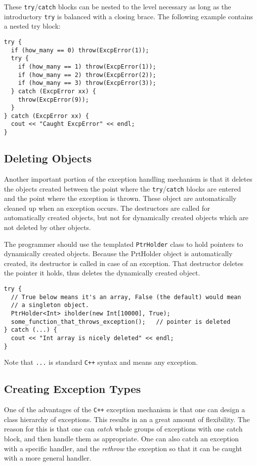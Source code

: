These {\tt try}/{\tt catch} blocks can be nested to the level necessary as
long as the introductory {\tt try} is balanced with a closing brace.
The following example contains a nested try block:
\begin{verbatim}
try {
  if (how_many == 0) throw(ExcpError(1));
  try {
    if (how_many == 1) throw(ExcpError(1));
    if (how_many == 2) throw(ExcpError(2));
    if (how_many == 3) throw(ExcpError(3));
  } catch (ExcpError xx) {
    throw(ExcpError(9));
  }
} catch (ExcpError xx) {
  cout << "Caught ExcpError" << endl;    
}
\end{verbatim}


\subsection{Deleting Objects}

Another important portion of the exception handling mechanism is that
it deletes the objects created between the point where the
{\tt try}/{\tt catch} blocks are entered and the point where the exception
is thrown. These object are automatically cleaned up when an exception
occurs. The destructors are called for automatically created objects, 
but not for dynamically created objects which are not deleted by
other objects.

The programmer should use the templated {\tt PtrHolder} class to hold
pointers to dynamically created objects. Because the PrtHolder object
is automatically created, its destructor is called in case of an
exception. That destructor deletes the pointer it holds, thus deletes
the dynamically created object.
\begin{verbatim}
try {
  // True below means it's an array, False (the default) would mean
  // a singleton object.
  PtrHolder<Int> iholder(new Int[10000], True);
  some_function_that_throws_exception();   // pointer is deleted
} catch (...) {
  cout << "Int array is nicely deleted" << endl;
}
\end{verbatim}
Note that {\tt ...} is standard {\tt C++} syntax and means any exception.

\subsection{Creating Exception Types}

One of the advantages of the {\tt C++} exception mechanism is that one can
design a class hierarchy of exceptions. This results in an a great amount 
of flexibility. The reason for this is that one can {\em catch} whole groups 
of exceptions with one catch block, and then handle them as appropriate. One 
can also catch an exception with a specific handler, and the {\em rethrow} 
the exception so that it can be caught with a more general handler.

